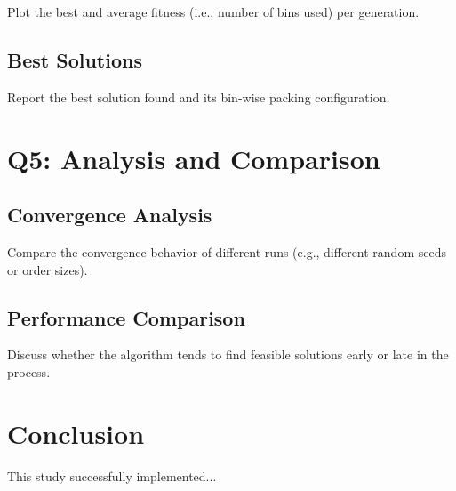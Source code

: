 \documentclass[journal,12pt,onecolumn]{IEEEtran}
\begin{document}
Plot the best and average fitness (i.e., number of bins used) per generation.

\subsection{Best Solutions}

Report the best solution found and its bin-wise packing configuration.

\section{Q5: Analysis and Comparison}

\subsection{Convergence Analysis}

Compare the convergence behavior of different runs (e.g., different random seeds or order sizes).

\subsection{Performance Comparison}

Discuss whether the algorithm tends to find feasible solutions early or late in the process.

\section{Conclusion}
This study successfully implemented...
\end{document}
